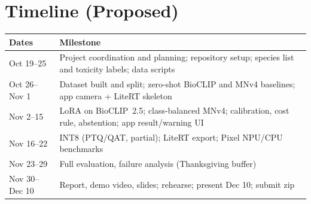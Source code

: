 \documentclass[conference,10pt]{IEEEtran}
\begin{document}
\section{Timeline (Proposed)}
{\centering\footnotesize
\begin{tabular}{@{}lp{}@{}}
\toprule
\textbf{Dates} & \textbf{Milestone} \\ \midrule
Oct 19--25 & Project coordination and planning; repository setup; species list and toxicity labels; data scripts \\
Oct 26--Nov 1 & Dataset built and split; zero-shot BioCLIP and MNv4 baselines; app camera + LiteRT skeleton \\
Nov 2--15 & LoRA on BioCLIP~2.5; class-balanced MNv4; calibration, cost rule, abstention; app result/warning UI \\
Nov 16--22 & INT8 (PTQ/QAT, partial); LiteRT export; Pixel NPU/CPU benchmarks \\
Nov 23--29 & Full evaluation, failure analysis (Thanksgiving buffer) \\
Nov 30--Dec 10 & Report, demo video, slides; rehearse; present Dec 10; submit zip \\ \bottomrule
\end{tabular}\par}

\footnotesize


\end{document}
